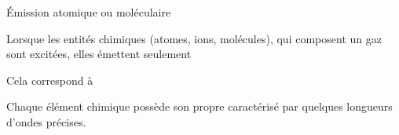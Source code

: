 \begin{doc}{Émission atomique ou moléculaire}
  \vspace{-24pt}
  \begin{encart}
    Lorsque les entités chimiques (atomes, ions, molécules), qui composent un gaz \\[8pt]
    sont excitées, elles émettent seulement 
    
    Cela correspond à 
  \end{encart}
    
  Chaque élément chimique possède son propre  caractérisé par quelques longueurs d'ondes précises.
\end{doc}